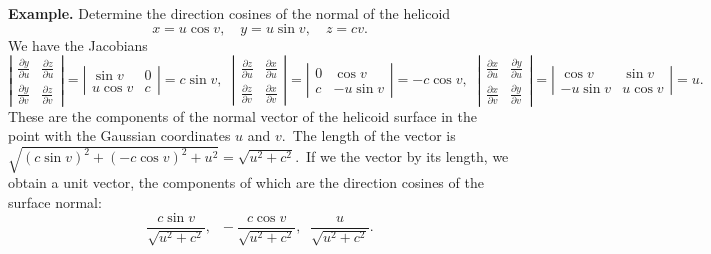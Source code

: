 \documentclass[12pt]{article}
\theoremstyle{definition}
\begin{document}
\textbf{Example.}  Determine the direction cosines of the normal of the helicoid
$$x = u\cos{v},\quad y = u\sin{v},\quad z = cv.$$
We have the Jacobians
$$\left| \begin{matrix}
\frac{\partial y}{\partial u} & \frac{\partial z}{\partial u}\\
\frac{\partial y}{\partial v} & \frac{\partial z}{\partial v}
\end{matrix}\right| =  
\left|\begin{matrix}
\sin{v} & 0 \\
u\cos{v} & c
\end{matrix}\right| = c\sin{v},\;\;
\left|\begin{matrix}
\frac{\partial z}{\partial u} & \frac{\partial x}{\partial u}\\
\frac{\partial z}{\partial v} & \frac{\partial x}{\partial v}
\end{matrix}\right| = 
\left|\begin{matrix}0 & \cos{v} \\
c & -u\sin{v}\end{matrix}\right| = -c\cos{v},\;\;
\left|\begin{matrix}
\frac{\partial x}{\partial u} & \frac{\partial y}{\partial u}\\
\frac{\partial x}{\partial v} & \frac{\partial y}{\partial v}
\end{matrix}\right| =
\left|\begin{matrix}\cos{v} & \sin{v}\\
-u\sin{v} & u\cos{v}\end{matrix}\right| = u.$$
These are the components of the normal vector of the helicoid surface in the point with the Gaussian coordinates $u$ and $v$.\, The length of the vector is\, $\sqrt{(c\sin{v})^2+(-c\cos{v})^2+u^2} = \sqrt{u^2+c^2}$.\, If we  the vector by its length, we obtain a unit vector, the components of which are the direction cosines of the surface normal:
$$\frac{c\sin{v}}{\sqrt{u^2+c^2}},\;\;-\frac{c\cos{v}}{\sqrt{u^2+c^2}},\;\;\frac{u}{\sqrt{u^2+c^2}}.$$
\end{document}
